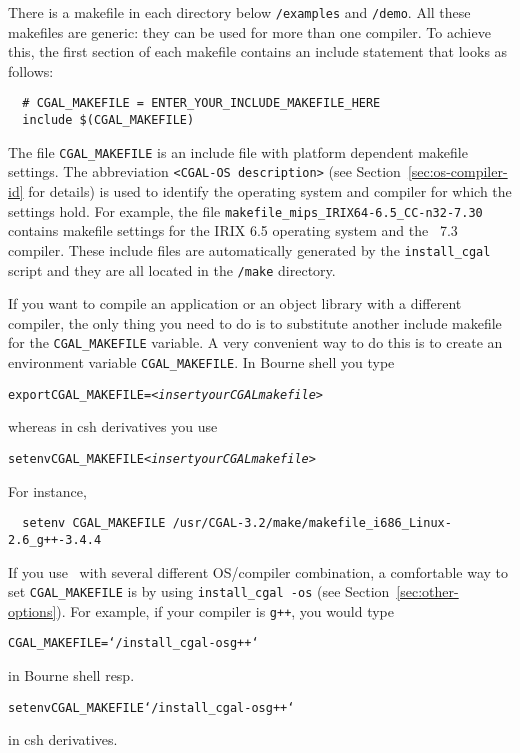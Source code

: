 There is a makefile in each directory below \texttt{\cgaldir/examples}
and \texttt{\cgaldir/demo}. All these makefiles are generic: they can
be used for more than one compiler. To achieve this, the first section
of each makefile contains an include statement that looks as follows:
\begin{verbatim}
  # CGAL_MAKEFILE = ENTER_YOUR_INCLUDE_MAKEFILE_HERE
  include $(CGAL_MAKEFILE)
\end{verbatim}

The file \texttt{CGAL\_MAKEFILE} is an include
file with platform dependent makefile
settings. The abbreviation \texttt{<CGAL-OS description>} (see
Section~\ref{sec:os-compiler-id} for details) is used to identify the
operating system and compiler for which the settings hold. For
example, the file \texttt{makefile\_mips\_IRIX64-6.5\_CC-n32-7.30}
contains makefile settings for the IRIX 6.5 operating system and the
\mipsprocc\ 7.3 compiler.  These include files are automatically
generated by the \texttt{install\_cgal} script and they are all
located in the \texttt{\cgaldir/make} directory.

If you want to compile an application or an object library with a
different compiler, the only thing you need to do is to substitute
another include makefile for the \texttt{CGAL\_MAKEFILE} variable. A
very convenient way to do this is to create an environment variable
\texttt{CGAL\_MAKEFILE}. In Bourne shell you type
\begin{alltt}
  export CGAL_MAKEFILE=<\textit{insert your CGAL makefile}>
\end{alltt}
whereas in csh derivatives you use
\begin{alltt}
  setenv CGAL_MAKEFILE <\textit{insert your CGAL makefile}>
\end{alltt}
For instance,
\begin{verbatim}
  setenv CGAL_MAKEFILE /usr/CGAL-3.2/make/makefile_i686_Linux-2.6_g++-3.4.4
\end{verbatim}

If you use \cgal\ with several different OS/compiler combination, a
comfortable way to set \texttt{CGAL\_MAKEFILE} is by using
\texttt{install\_cgal~-os} (see Section~\ref{sec:other-options}).  For
example, if your compiler is \texttt{g++}, you would type
\begin{alltt}
CGAL_MAKEFILE=`\yourcgaldir/install_cgal -os g++`
\end{alltt}
in Bourne shell resp.
\begin{alltt}
setenv CGAL_MAKEFILE `\yourcgaldir/install_cgal -os g++`
\end{alltt}
in csh derivatives.

